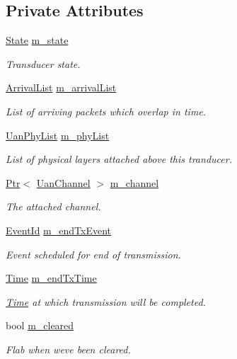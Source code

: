 \subsection*{Private Attributes}
\begin{DoxyCompactItemize}
\item 
\hyperlink{classns3_1_1UanTransducer_a037314c27ca07c9c6234460086058bce}{State} \hyperlink{classns3_1_1UanTransducerHd_a4f7b41e0c43685c3e6abebd1a543ab36}{m\+\_\+state}
\begin{DoxyCompactList}\small\item\em Transducer state. \end{DoxyCompactList}\item 
\hyperlink{classns3_1_1UanTransducer_a95332a21e30506421a116d4b5c4dfd75}{Arrival\+List} \hyperlink{classns3_1_1UanTransducerHd_a7cddd8b5406534b21219ffd643be33fa}{m\+\_\+arrival\+List}
\begin{DoxyCompactList}\small\item\em List of arriving packets which overlap in time. \end{DoxyCompactList}\item 
\hyperlink{classns3_1_1UanTransducer_a3bac0e2447ad40f48533d14b10d01212}{Uan\+Phy\+List} \hyperlink{classns3_1_1UanTransducerHd_afb3b10ff175e4f315894b9ba13a8c490}{m\+\_\+phy\+List}
\begin{DoxyCompactList}\small\item\em List of physical layers attached above this tranducer. \end{DoxyCompactList}\item 
\hyperlink{classns3_1_1Ptr}{Ptr}$<$ \hyperlink{classns3_1_1UanChannel}{Uan\+Channel} $>$ \hyperlink{classns3_1_1UanTransducerHd_a6124f374654fef345db73e26d12c0eb1}{m\+\_\+channel}
\begin{DoxyCompactList}\small\item\em The attached channel. \end{DoxyCompactList}\item 
\hyperlink{classns3_1_1EventId}{Event\+Id} \hyperlink{classns3_1_1UanTransducerHd_ab7bf49e797bf263994d55f1e59c771c0}{m\+\_\+end\+Tx\+Event}
\begin{DoxyCompactList}\small\item\em Event scheduled for end of transmission. \end{DoxyCompactList}\item 
\hyperlink{classns3_1_1Time}{Time} \hyperlink{classns3_1_1UanTransducerHd_adcf9f31a8fb4054fca32412a13179165}{m\+\_\+end\+Tx\+Time}
\begin{DoxyCompactList}\small\item\em \hyperlink{classns3_1_1Time}{Time} at which transmission will be completed. \end{DoxyCompactList}\item 
bool \hyperlink{classns3_1_1UanTransducerHd_a54444d90f503964839dc6aea061a4f9e}{m\+\_\+cleared}
\begin{DoxyCompactList}\small\item\em Flab when we\textquotesingle{}ve been cleared. \end{DoxyCompactList}\end{DoxyCompactItemize}
